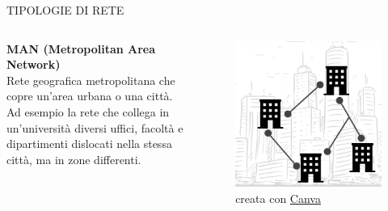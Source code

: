 \documentclass[aspectratio=1610]{beamer}
\begin{document}
\begin{frame}{TIPOLOGIE DI RETE}
    \begin{columns}
            \justifying
            \textbf{MAN (Metropolitan Area Network)} \\
            Rete geografica metropolitana che copre un'area urbana o una città. Ad esempio la rete che collega 
            in un'università diversi uffici, facoltà e dipartimenti dislocati nella stessa città, ma in zone 
            differenti.
            \begin{figure}
                \includegraphics[width=\linewidth]{img/man.png}
                \caption{{creata con \href{https://www.canva.com/}{Canva}}}
            \end{figure}
    \end{columns}
\end{frame}
\end{document}
